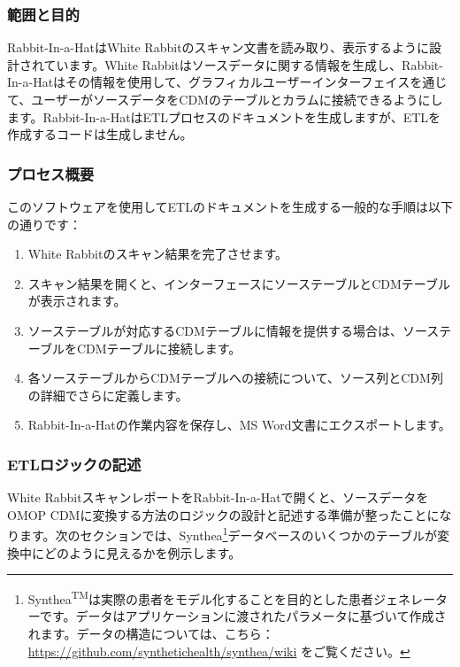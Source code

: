 \documentclass[
  11pt]{book}
\providecommand{\tightlist}{%
  \setlength{\itemsep}{0pt}\setlength{\parskip}{0pt}}
\theoremstyle{definition}
\theoremstyle{definition}
\theoremstyle{definition}
\theoremstyle{definition}
\theoremstyle{remark}
\begin{document}
\subsubsection*{範囲と目的}\label{ux7bc4ux56f2ux3068ux76eeux7684-1}

Rabbit-In-a-HatはWhite Rabbitのスキャン文書を読み取り、表示するように設計されています。White Rabbitはソースデータに関する情報を生成し、Rabbit-In-a-Hatはその情報を使用して、グラフィカルユーザーインターフェイスを通じて、ユーザーがソースデータをCDMのテーブルとカラムに接続できるようにします。Rabbit-In-a-HatはETLプロセスのドキュメントを生成しますが、ETLを作成するコードは生成しません。

\subsubsection*{プロセス概要}\label{ux30d7ux30edux30bbux30b9ux6982ux8981-1}

このソフトウェアを使用してETLのドキュメントを生成する一般的な手順は以下の通りです：

\begin{enumerate}
\def\labelenumi{\arabic{enumi}.}
\tightlist
\item
  White Rabbitのスキャン結果を完了させます。
\item
  スキャン結果を開くと、インターフェースにソーステーブルとCDMテーブルが表示されます。
\item
  ソーステーブルが対応するCDMテーブルに情報を提供する場合は、ソーステーブルをCDMテーブルに接続します。
\item
  各ソーステーブルからCDMテーブルへの接続について、ソース列とCDM列の詳細でさらに定義します。
\item
  Rabbit-In-a-Hatの作業内容を保存し、MS Word文書にエクスポートします。
\end{enumerate}

\subsubsection*{ETLロジックの記述}\label{etlux30edux30b8ux30c3ux30afux306eux8a18ux8ff0}

White RabbitスキャンレポートをRabbit-In-a-Hatで開くと、ソースデータをOMOP CDMに変換する方法のロジックの設計と記述する準備が整ったことになります。次のセクションでは、Synthea\footnote{Synthea\textsuperscript{TM}は実際の患者をモデル化することを目的とした患者ジェネレーターです。データはアプリケーションに渡されたパラメータに基づいて作成されます。データの構造については、こちら：\url{https://github.com/synthetichealth/synthea/wiki} をご覧ください。}データベースのいくつかのテーブルが変換中にどのように見えるかを例示します。
\end{document}
